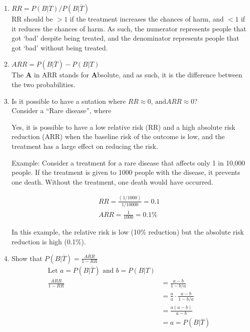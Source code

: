 \documentclass{article}
\begin{document}
\begin{enumerate}[label=\alph*)]
    \item \(RR = P(B \vert T) / P(B \vert \overline{T})\) \\
          RR should be \(> 1\) if the treatment increases the chances of harm, and \(< 1\) if it reduces the chances of harm.
          As such, the numerator represents people that got `bad' despite being treated, and the denominator represents people that got `bad' without being treated.
    \item \(ARR = P(B \vert \overline{T}) - P(B \vert T)\) \\
          The \textbf{A} in ARR stands for \textbf{A}bsolute, and as such, it is the difference between the two probabilities.
    \item Is it possible to have a sutation where \(RR \approx 0 \text{, and} ARR \approx 0\)? \\
          Consider a ``Rare disease'', where

          Yes, it is possible to have a low relative risk (RR) and a high absolute risk reduction (ARR) when the baseline risk of the outcome is low, and the treatment has a large effect on reducing the risk.

          Example: Consider a treatment for a rare disease that affects only 1 in 10,000 people. If the treatment is given to 1000 people with the disease, it prevents one death. Without the treatment, one death would have occurred.

          \begin{align*}
              RR = \frac{(1/1000)}{1/10000} = 0.1 \\
              ARR = \frac{1}{1000} = 0.1\%
          \end{align*}

          In this example, the relative risk is low (10\% reduction) but the absolute risk reduction is high (0.1\%).

    \item Show that \(P(B \vert \overline{T}) = \frac{ARR}{1-RR}\)
          \begin{align*}
              \text{Let } a = P(B \vert \overline{T}) \text{ and } b = P(B \vert T) \\
              \frac{
                  ARR
              }{
                  1-RR
              } & = \frac{a - b}{ 1 - b/a}                                          \\
                & = \frac{a}{a} \cdot \frac{a-b}{1 - b/a}                           \\
                & = \frac{a(a-b)}{a-b}                                              \\
                & = a =P(B \vert \overline{T})
          \end{align*}
\end{enumerate}
\end{document}

